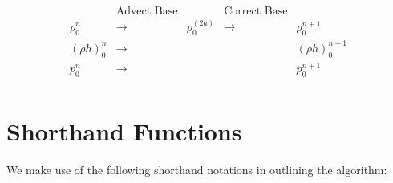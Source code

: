 \begin{equation}
\left.\begin{array}{ccccccc}
& \text{Advect Base} & & \text{Correct Base} & \\
\rho_0^n & \longrightarrow & \rho_0^{(2a)} & \longrightarrow & \rho_0^{n+1} \\
(\rho h)_0^n & \longrightarrow & & & (\rho h)_0^{n+1} \\
p_0^n & \longrightarrow & & & p_0^{n+1} \\
\end{array}\right.\nonumber
\end{equation}
\section{Shorthand Functions}
We make use of the following shorthand notations in outlining the algorithm:
